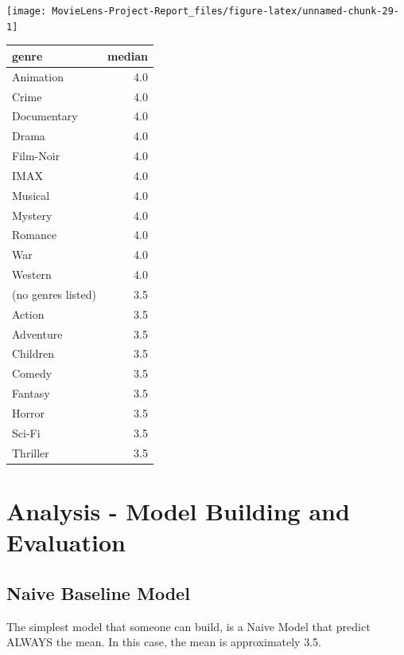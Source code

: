 \documentclass[
]{article}
\begin{document}
\begin{center}\texttt{[image: MovieLens-Project-Report\_files/figure-latex/unnamed-chunk-29-1]} \end{center}

\begin{table}[!h]
\centering\begingroup\fontsize{10}{12}\selectfont

\begin{tabular}{l|r}
\hline
genre & median\\
\hline
Animation & 4.0\\
\hline
Crime & 4.0\\
\hline
Documentary & 4.0\\
\hline
Drama & 4.0\\
\hline
Film-Noir & 4.0\\
\hline
IMAX & 4.0\\
\hline
Musical & 4.0\\
\hline
Mystery & 4.0\\
\hline
Romance & 4.0\\
\hline
War & 4.0\\
\hline
Western & 4.0\\
\hline
(no genres listed) & 3.5\\
\hline
Action & 3.5\\
\hline
Adventure & 3.5\\
\hline
Children & 3.5\\
\hline
Comedy & 3.5\\
\hline
Fantasy & 3.5\\
\hline
Horror & 3.5\\
\hline
Sci-Fi & 3.5\\
\hline
Thriller & 3.5\\
\hline
\end{tabular}
\endgroup{}
\end{table}

\hypertarget{analysis---model-building-and-evaluation}{%
\section{Analysis - Model Building and
Evaluation}\label{analysis---model-building-and-evaluation}}

\hypertarget{naive-baseline-model}{%
\subsection{Naive Baseline Model}\label{naive-baseline-model}}

The simplest model that someone can build, is a Naive Model that predict
ALWAYS the mean. In this case, the mean is approximately 3.5.
\end{document}

